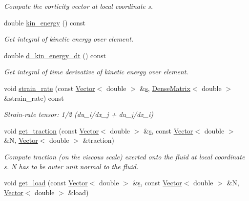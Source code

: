 \begin{DoxyCompactItemize}
\begin{DoxyCompactList}\small\item\em Compute the vorticity vector at local coordinate s. \end{DoxyCompactList}\item 
double \hyperlink{classoomph_1_1SphericalNavierStokesEquations_aa374af3cc246ada66f17b19a9564a6d3}{kin\+\_\+energy} () const
\begin{DoxyCompactList}\small\item\em Get integral of kinetic energy over element. \end{DoxyCompactList}\item 
double \hyperlink{classoomph_1_1SphericalNavierStokesEquations_a0c6aba8fc927c3e40e9abb362dc8797f}{d\+\_\+kin\+\_\+energy\+\_\+dt} () const
\begin{DoxyCompactList}\small\item\em Get integral of time derivative of kinetic energy over element. \end{DoxyCompactList}\item 
void \hyperlink{classoomph_1_1SphericalNavierStokesEquations_a4688b8021ff388a878ac9edbb218ef56}{strain\+\_\+rate} (const \hyperlink{classoomph_1_1Vector}{Vector}$<$ double $>$ \&\hyperlink{cfortran_8h_ab7123126e4885ef647dd9c6e3807a21c}{s}, \hyperlink{classoomph_1_1DenseMatrix}{Dense\+Matrix}$<$ double $>$ \&strain\+\_\+rate) const
\begin{DoxyCompactList}\small\item\em Strain-\/rate tensor\+: 1/2 (du\+\_\+i/dx\+\_\+j + du\+\_\+j/dx\+\_\+i) \end{DoxyCompactList}\item 
void \hyperlink{classoomph_1_1SphericalNavierStokesEquations_aaf2cd60aa4dc7524aab4cf2ace49805c}{get\+\_\+traction} (const \hyperlink{classoomph_1_1Vector}{Vector}$<$ double $>$ \&\hyperlink{cfortran_8h_ab7123126e4885ef647dd9c6e3807a21c}{s}, const \hyperlink{classoomph_1_1Vector}{Vector}$<$ double $>$ \&N, \hyperlink{classoomph_1_1Vector}{Vector}$<$ double $>$ \&traction)
\begin{DoxyCompactList}\small\item\em Compute traction (on the viscous scale) exerted onto the fluid at local coordinate s. N has to be outer unit normal to the fluid. \end{DoxyCompactList}\item 
void \hyperlink{classoomph_1_1SphericalNavierStokesEquations_aedb2bcbc50b05bf623ef544e5ed3bbbf}{get\+\_\+load} (const \hyperlink{classoomph_1_1Vector}{Vector}$<$ double $>$ \&\hyperlink{cfortran_8h_ab7123126e4885ef647dd9c6e3807a21c}{s}, const \hyperlink{classoomph_1_1Vector}{Vector}$<$ double $>$ \&N, \hyperlink{classoomph_1_1Vector}{Vector}$<$ double $>$ \&load)

\end{DoxyCompactItemize}
